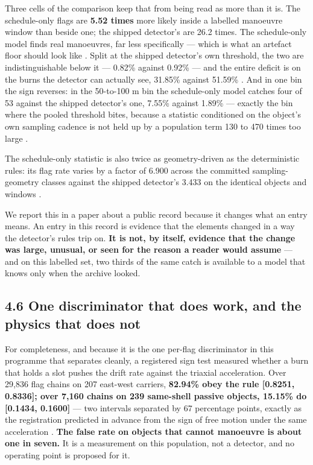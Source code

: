 \documentclass[11pt]{article}
\begin{document}
Three cells of the comparison keep that from being read as more than it is. The schedule-only flags are \textbf{5.52 times} more likely inside a labelled manoeuvre window than beside one; the shipped detector's are 26.2 times. The schedule-only model finds real manoeuvres, far less specifically --- which is what an artefact floor should look like%
. Split at the shipped detector's own threshold, the two are indistinguishable below it --- 0.82\% against 0.92\% --- and the entire deficit is on the burns the detector can actually see, 31.85\% against 51.59\%%
. And in one bin the sign reverses: in the 50-to-100 m bin the schedule-only model catches four of 53 against the shipped detector's one, 7.55\% against 1.89\% --- exactly the bin where the pooled threshold bites, because a statistic conditioned on the object's own sampling cadence is not held up by a population term 130 to 470 times too large%
.

The schedule-only statistic is also twice as geometry-driven as the deterministic rules: its flag rate varies by a factor of 6.900 across the committed sampling-geometry classes against the shipped detector's 3.433 on the identical objects and windows%
.

We report this in a paper about a public record because it changes what an entry means. An entry in this record is evidence that the elements changed in a way the detector's rules trip on. \textbf{It is not, by itself, evidence that the change was large, unusual, or seen for the reason a reader would assume} --- and on this labelled set, two thirds of the same catch is available to a model that knows only when the archive looked.

\subsection*{4.6 One discriminator that does work, and the physics that does not}

For completeness, and because it is the one per-flag discriminator in this programme that separates cleanly, a registered sign test measured whether a burn that holds a slot pushes the drift rate against the triaxial acceleration. Over 29,836 flag chains on 207 east-west carriers, \textbf{82.94\% obey the rule [0.8251, 0.8336]; over 7,160 chains on 239 same-shell passive objects, 15.15\% do [0.1434, 0.1600]} --- two intervals separated by 67 percentage points, exactly as the registration predicted in advance from the sign of free motion under the same acceleration%
. \textbf{The false rate on objects that cannot manoeuvre is about one in seven.} It is a measurement on this population, not a detector, and no operating point is proposed for it.
\end{document}
